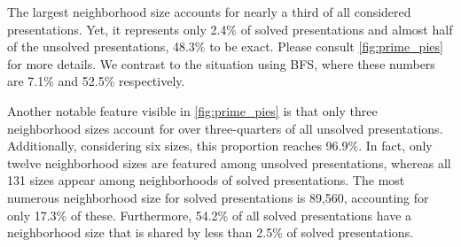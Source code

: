 The largest neighborhood size accounts for nearly a third of all considered presentations.
Yet, it represents only 2.4\% of solved presentations and almost half of the unsolved presentations, 48.3\% to be exact.
Please consult \cref{fig:prime_pies} for more details.
We contrast to the situation using BFS, where these numbers are 7.1\% and 52.5\% respectively.

Another notable feature visible in \cref{fig:prime_pies} is that only three neighborhood sizes account for over three-quarters of all unsolved presentations.
Additionally, considering six sizes, this proportion reaches 96.9\%.
In fact, only twelve neighborhood sizes are featured among unsolved presentations, whereas all 131 sizes appear among neighborhoods of solved presentations.
The most numerous neighborhood size for solved presentations is 89,560, accounting for only 17.3\% of these.
Furthermore, 54.2\% of all solved presentations have a neighborhood size that is shared by less than 2.5\% of solved presentations.

